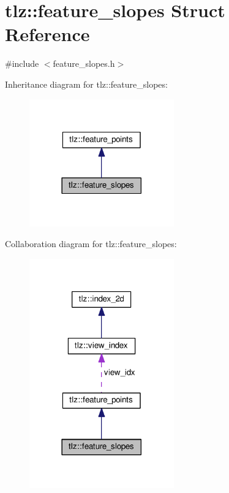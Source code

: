 \hypertarget{structtlz_1_1feature__slopes}{}\section{tlz\+:\+:feature\+\_\+slopes Struct Reference}
\label{structtlz_1_1feature__slopes}


{\ttfamily \#include $<$feature\+\_\+slopes.\+h$>$}



Inheritance diagram for tlz\+:\+:feature\+\_\+slopes\+:
\nopagebreak
\begin{figure}[H]
\begin{center}
\leavevmode
\includegraphics[width=177pt]{structtlz_1_1feature__slopes__inherit__graph}
\end{center}
\end{figure}


Collaboration diagram for tlz\+:\+:feature\+\_\+slopes\+:
\nopagebreak
\begin{figure}[H]
\begin{center}
\leavevmode
\includegraphics[width=177pt]{structtlz_1_1feature__slopes__coll__graph}
\end{center}
\end{figure}
